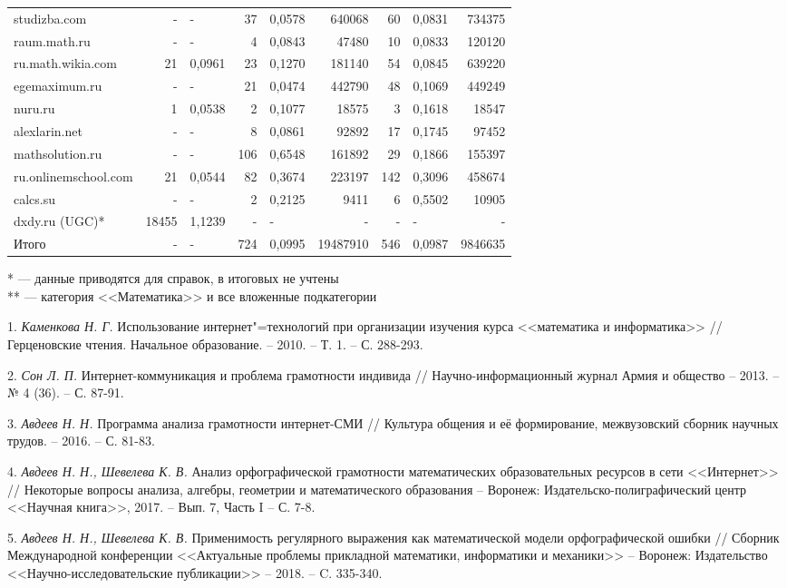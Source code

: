{\begin{landscape}
\begin{tabular}{|l|r|l|r|l|r|r|l|r|}
studizba.com         &     -  & -      &  37  & 0,0578 &   640068  &   60  &  0,0831  &   734375  \\
raum.math.ru         &     -  & -      &   4  & 0,0843 &    47480  &   10  &  0,0833  &   120120  \\
ru.math.wikia.com    &    21  & 0,0961 &  23  & 0,1270 &   181140  &   54  &  0,0845  &   639220  \\
egemaximum.ru        &     -  & -      &  21  & 0,0474 &   442790  &   48  &  0,1069  &   449249  \\
nuru.ru              &     1  & 0,0538 &   2  & 0,1077 &    18575  &    3  &  0,1618  &    18547  \\
alexlarin.net        &     -  & -      &   8  & 0,0861 &    92892  &   17  &  0,1745  &    97452  \\
mathsolution.ru      &     -  & -      & 106  & 0,6548 &   161892  &   29  &  0,1866  &   155397  \\
ru.onlinemschool.com &    21  & 0,0544 &  82  & 0,3674 &   223197  &  142  &  0,3096  &   458674  \\
calcs.su             &     -  & -      &   2  & 0,2125 &     9411  &    6  &  0,5502  &    10905  \\
dxdy.ru (UGC)*       & 18455  & 1,1239 &   -  & -      &        -  &    -  &  -       &        -  \\
\hline
Итого                &     -  & -      & 724  & 0,0995 & 19487910  &  546  &  0,0987  &  9846635  \\
\hline
\end{tabular}
\end{landscape}
}
* --- данные приводятся для справок, в итоговых не учтены
\\
** --- категория <<Математика>> и все вложенные подкатегории
\\

\litlist

1. {\it Каменкова Н. Г.}
 Использование интернет"=технологий при организации изучения курса <<математика и информатика>>
 // Герценовские чтения. Начальное образование. – 2010. – Т. 1. – С. 288-293.

2. {\it Сон Л. П.}
 Интернет-коммуникация и проблема грамотности индивида // Научно-информационный журнал Армия и общество – 2013. – № 4 (36). – С. 87-91.

3. {\it Авдеев Н. Н.}
 Программа анализа грамотности интернет-СМИ // Культура общения и её формирование, межвузовский сборник научных трудов. – 2016. – С. 81-83.

4. {\it Авдеев Н. Н., Шевелева К. В.}
 Анализ орфографической грамотности математических образовательных ресурсов в сети <<Интернет>> // Некоторые вопросы анализа,
 алгебры, геометрии и математического образования – Воронеж: Издательско-полиграфический центр <<Научная книга>>, 2017. – Вып. 7, Часть I – С. 7-8.

5. {\it Авдеев Н. Н., Шевелева К. В.}
 Применимость регулярного выражения как математической модели орфографической ошибки // Сборник Международной конференции <<Актуальные
 проблемы прикладной математики, информатики и механики>> – Воронеж: Издательство <<Научно-исследовательские публикации>> – 2018. – C. 335-340.
